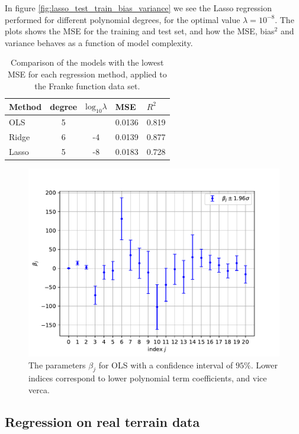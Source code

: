 In figure \ref{fig:lasso_test_train_bias_variance} we see the Lasso regression performed for different polynomial degrees, for the optimal value $\lambda=10^{-8}$. The plots shows the MSE for the training and test set, and how the MSE, bias$^2$ and variance behaves as a function of model complexity.


\begin{table}[!h]
    \caption{Comparison of the models with the lowest MSE for each regression method, applied to the Franke function data set.}
    \label{tab:franke}
    \begin{tabular}{|l|c|c|l|l|}
        \hline
        Method & degree & $\text{log}_{10} \lambda$ & MSE     & $R^2$  \\ \hline
        OLS    & 5 &  & 0.0136  & 0.819  \\ \hline
        Ridge  & 6 & -4 & 0.0139  & 0.877  \\ \hline
        Lasso  & 5 & -8 & 0.0183 & 0.728 \\ \hline
    \end{tabular}
\end{table}


\begin{figure}[!h]
    \centering
    \includegraphics[scale=0.48]{Figures/OLS/confidence_interval_betas_024.pdf}
    \caption{The parameters $\beta_j$ for OLS with a confidence interval of $95\%$. Lower indices correspond to lower polynomial term coefficients, and vice verca.}
    \label{fig:ols_frankie_confidence}
\end{figure}


\subsection{Regression on real terrain data}

